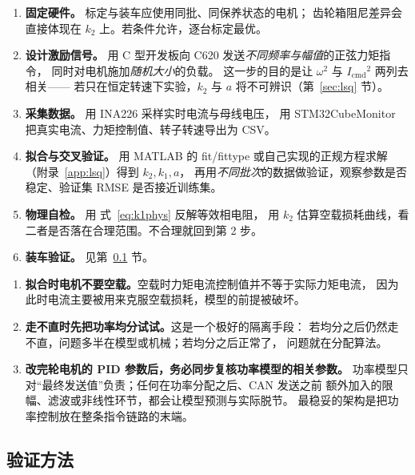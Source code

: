 \documentclass[cn,blue,11pt,device=normal]{elegantnote}
\newcommand{\code}[1]{{\ttfamily\small\def\_{\textunderscore\allowbreak}#1}}
\newcommand{\Icmd}{I_{\mathrm{cmd}}{}}
\newcommand{\fref}[1]{式~\eqref{#1}}
\begin{document}
\begin{enumerate}
  \item \textbf{固定硬件。} 标定与装车应使用同批、同保养状态的电机；
  齿轮箱阻尼差异会直接体现在 $k_2$ 上。若条件允许，逐台标定最优。
  \item \textbf{设计激励信号。} 用 C 型开发板向 C620 发送\emph{不同频率与幅值}的正弦力矩指令，
  同时对电机施加\emph{随机大小}的负载。
  这一步的目的是让 $\omega^2$ 与 $\Icmd^2$ 两列去相关——
  若只在恒定转速下实验，$k_2$ 与 $a$ 将不可辨识（第~\ref{sec:lsq} 节）。
  \item \textbf{采集数据。} 用 INA226 采样实时电流与母线电压，
  用 STM32CubeMonitor 把真实电流、力矩控制值、转子转速导出为 CSV。
  \item \textbf{拟合与交叉验证。} 用 MATLAB 的 \code{fit}/\code{fittype}
  或自己实现的正规方程求解（附录~\ref{app:lsq}）得到 $k_2,k_1,a$，
  再用\emph{不同批次}的数据做验证，观察参数是否稳定、验证集 RMSE 是否接近训练集。
  \item \textbf{物理自检。} 用 \fref{eq:k1phys} 反解等效相电阻，
  用 $k_2$ 估算空载损耗曲线，看二者是否落在合理范围。不合理就回到第 2 步。
  \item \textbf{装车验证。} 见第~\ref{sec:verify} 节。
\end{enumerate}

\begin{note}[三条来自开源实现的经验]
\begin{enumerate}
  \item \textbf{拟合时电机不要空载。}空载时力矩电流控制值并不等于实际力矩电流，
  因为此时电流主要被用来克服空载损耗，模型的前提被破坏。
  \item \textbf{走不直时先把功率均分试试。}这是一个极好的隔离手段：
  若均分之后仍然走不直，问题多半在模型或机械；若均分之后正常了，
  问题就在分配算法。
  \item \textbf{改完轮电机的 PID 参数后，务必同步复核功率模型的相关参数。}
  功率模型只对“最终发送值”负责；任何在功率分配之后、CAN 发送之前
  额外加入的限幅、滤波或非线性环节，都会让模型预测与实际脱节。
  最稳妥的架构是把功率控制放在整条指令链路的末端。
\end{enumerate}
\end{note}

\subsection{验证方法}\label{sec:verify}
\end{document}
